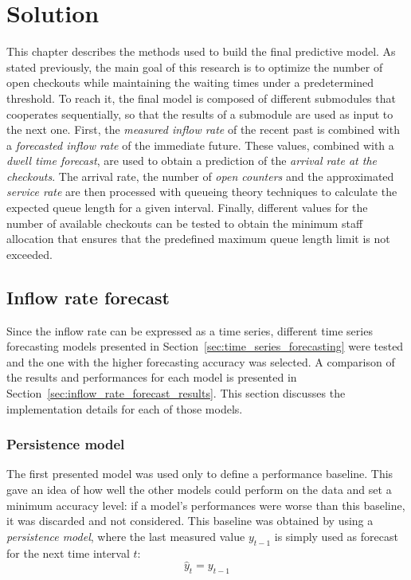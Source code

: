 \chapter{Solution}
\label{cha:solution}

This chapter describes the methods used to build the final predictive model. As stated previously, the main goal of this research is to optimize the number of open checkouts while maintaining the waiting times under a predetermined threshold. To reach it, the final model is composed of different submodules that cooperates sequentially, so that the results of a submodule are used as input to the next one. First, the \emph{measured inflow rate} of the recent past is combined with a \emph{forecasted inflow rate} of the immediate future. These values, combined with a \emph{dwell time forecast}, are used to obtain a prediction of the \emph{arrival rate at the checkouts}. The arrival rate, the number of \emph{open counters} and the approximated \emph{service rate} are then processed with queueing theory techniques to calculate the expected queue length for a given interval. Finally, different values for the number of available checkouts can be tested to obtain the minimum staff allocation that ensures that the predefined maximum queue length limit is not exceeded.

\section{Inflow rate forecast}
\label{sec:inflow_rate_forecast}

Since the inflow rate can be expressed as a time series, different time series forecasting models presented in Section~\ref{sec:time_series_forecasting} were tested and the one with the higher forecasting accuracy was selected. A comparison of the results and performances for each model is presented in Section~\ref{sec:inflow_rate_forecast_results}. This section discusses the implementation details for each of those models.

\subsection{Persistence model}
\label{subsec:persistence_model}

The first presented model was used only to define a performance baseline. This gave an idea of how well the other models could perform on the data and set a minimum accuracy level: if a model’s performances were worse than this baseline, it was discarded and not considered. This baseline was obtained by using a \emph{persistence model}, where the last measured value \( y_{t-1} \) is simply used as forecast for the next time interval \( t \):
\begin{equation}
  \hat{y}_t = y_{t-1}
\end{equation}

